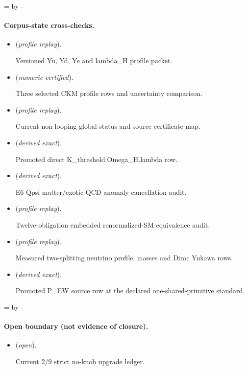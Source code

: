 \documentclass[11pt]{article}
\begin{document}
\par\begingroup{}=\pagegoal\advance{} by -\pagetotal\ifdim\dimen0<7\baselineskip\newpage\fi\endgroup
\paragraph{Corpus-state cross-checks.}
\begin{itemize}
\setlength{\itemsep}{0.25em}
\item {} (\emph{profile replay}).\par Versioned Yu, Yd, Ye and lambda\_H profile packet.
\item {} (\emph{numeric certified}).\par Three selected CKM profile rows and uncertainty comparison.
\item {} (\emph{profile replay}).\par Current non-looping global status and source-certificate map.
\item {} (\emph{derived exact}).\par Promoted direct K\_threshold.Omega\_H.lambda row.
\item {} (\emph{derived exact}).\par E6 Qpsi matter/exotic QCD anomaly cancellation audit.
\item {} (\emph{profile replay}).\par Twelve-obligation embedded renormalized-SM equivalence audit.
\item {} (\emph{profile replay}).\par Measured two-splitting neutrino profile, masses and Dirac Yukawa rows.
\item {} (\emph{derived exact}).\par Promoted P\_EW source row at the declared one-shared-primitive standard.
\end{itemize}

\par\begingroup{}=\pagegoal\advance{} by -\pagetotal\ifdim\dimen0<7\baselineskip\newpage\fi\endgroup
\paragraph{Open boundary (not evidence of closure).}
\begin{itemize}
\setlength{\itemsep}{0.25em}
\item {} (\emph{open}).\par Current 2/9 strict no-knob upgrade ledger.
\end{itemize}
\end{document}
